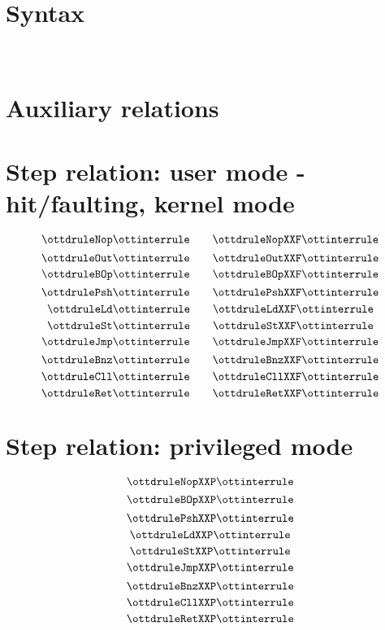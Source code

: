 \documentclass{article}
\begin{document}
\section*{Syntax}

\ottmetavars\\[3ex]

\ottgrammartabular{
\ottn\ottinterrule
\ottb\ottinterrule
\ottT\ottinterrule
\ottC\ottinterrule
\ottki\ottinterrule
\ottko\ottinterrule
\ottkbot\ottinterrule
\otta\ottinterrule
\ottinstr\ottinterrule
\ottS\ottinterrule
}

\section*{Auxiliary relations}

\ottgrammartabular{
\ottformula\ottinterrule
}

\clearpage
\section*{Step relation: user mode - hit/faulting, kernel mode}

\[ \ottdruleNop \ottinterrule 
   \quad \quad \ottdruleNopXXF \ottinterrule \]
\[ \ottdruleOut \ottinterrule
   \quad \quad  \ottdruleOutXXF \ottinterrule \]
\[ \ottdruleBOp \ottinterrule
   \quad \quad \ottdruleBOpXXF \ottinterrule \]
\[ \ottdrulePsh \ottinterrule 
   \quad \quad \ottdrulePshXXF \ottinterrule \]
 \[ \ottdruleLd \ottinterrule 
   \quad \quad \ottdruleLdXXF \ottinterrule \]
\[ \ottdruleSt \ottinterrule
   \quad \quad \ottdruleStXXF \ottinterrule \]
\[ \ottdruleJmp \ottinterrule
   \quad \quad \ottdruleJmpXXF \ottinterrule \]
\[ \ottdruleBnz \ottinterrule 
   \quad \quad  \ottdruleBnzXXF \ottinterrule  \] 
\[ \ottdruleCll \ottinterrule
   \quad \quad  \ottdruleCllXXF \ottinterrule \]
\[ \ottdruleRet \ottinterrule   
   \quad \quad  \ottdruleRetXXF \ottinterrule \]

\section*{Step relation: privileged mode}

\[ \ottdruleNopXXP \ottinterrule \]
\[ \ottdruleBOpXXP \ottinterrule \]
\[ \ottdrulePshXXP \ottinterrule \]
\[ \ottdruleLdXXP \ottinterrule \]
\[ \ottdruleStXXP \ottinterrule \]
\[ \ottdruleJmpXXP \ottinterrule \]
\[ \ottdruleBnzXXP \ottinterrule \] 
\[ \ottdruleCllXXP \ottinterrule \]
\[ \ottdruleRetXXP \ottinterrule \] 


\end{document}

